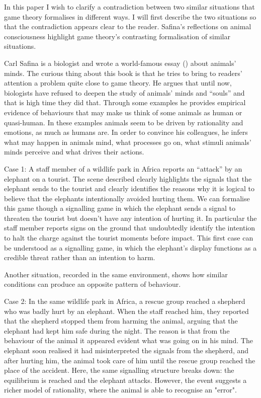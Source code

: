 In this paper I wish to clarify a contradiction between two similar situations that game theory formalises in different ways.
I will first describe the two situations so that the contradiction appears clear to the reader. Safina’s reflections on animal consciousness highlight game theory’s contrasting formalisation of similar situations.

\vspace{1em}
Carl Safina is a biologist and wrote a world-famous essay (\cite{Safina2015}) about animals' minds. The curious thing about this book is that he tries to bring to readers' attention a problem quite close to game theory. He argues that until now, biologists have refused to deepen the study of animals' minds and “souls” and that is high time they did that. Through some examples he provides empirical evidence of behaviours that may make us think of some animals as human or quasi-human. In these examples animals seem to be driven by rationality and emotions, as much as humans are.
In order to convince his colleagues, he infers what may happen in animals mind, what processes go on, what stimuli animals' minds perceive and what drives their actions.

\vspace{1em}
Case 1:
A staff member of a wildlife park in Africa reports an “attack” by an elephant on a tourist. The scene described clearly highlights the signals that the elephant sends to the tourist and clearly identifies the reasons why it is logical to believe that the elephants intentionally avoided hurting them. We can formalise this game though a signalling game in which the elephant sends a signal to threaten the tourist but doesn’t have any intention of hurting it.
In particular the staff member reports signs on the ground that undoubtedly identify the intention to halt the charge against the tourist moments before impact. This first case can be understood as a signalling game, in which the elephant’s display functions as a credible threat rather than an intention to harm.

\vspace{1em}
Another situation, recorded in the same environment, shows how similar conditions can produce an opposite pattern of behaviour.

\vspace{1em}
Case 2:
In the same wildlife park in Africa, a rescue group reached a shepherd who was badly hurt by an elephant. When the staff reached him, they reported that the shepherd stopped them from harming the animal, arguing that the elephant had kept him safe during the night. The reason is that from the behaviour of the animal it appeared evident what was going on in his mind. The elephant soon realised it had misinterpreted the signals from the shepherd, and after hurting him, the animal took care of him until the rescue group reached the place of the accident.
Here, the same signalling structure breaks down: the equilibrium is reached and the elephant attacks. However,
the event suggests a richer model of rationality, where the animal is able to recognise an "error".
\vspace{1em}

